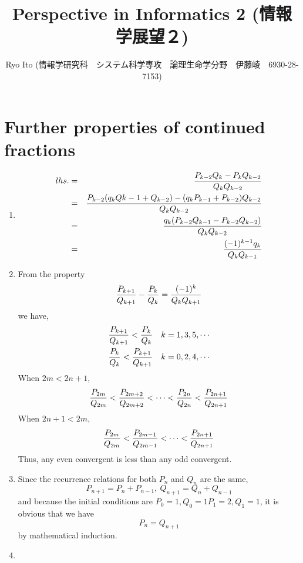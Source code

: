 \documentclass{jarticle}
\title{Perspective in Informatics 2 (情報学展望２)}
\author{Ryo Ito (情報学研究科　システム科学専攻　論理生命学分野　伊藤崚　6930-28-7153)}
\date{}
\begin{document}
\maketitle

\section{Further properties of continued fractions}
\begin{enumerate}
\item
\begin{eqnarray}
    lhs. &=& {P_{k-2}Q_k - P_kQ_{k-2}\over Q_kQ_{k-2}}\\
    &=& {P_{k-2}(q_kQ{k-1}+Q_{k-2}) - (q_kP_{k-1}+P_{k-2})Q_{k-2}\over Q_kQ_{k-2}}\\
    &=& {q_k(P_{k-2}Q_{k-1} - P_{k-2}Q_{k-2})\over Q_kQ_{k-2}}\\
    &=& {(-1)^{k-1}q_k\over Q_kQ_{k-1}}
\end{eqnarray}

\item
From the property
\begin{equation}
    {P_{k+1}\over Q_{k+1}} - {P_k\over Q_k} = {(-1)^k\over Q_kQ_{k+1}}
\end{equation}
we have,
\begin{eqnarray}
    {P_{k+1}\over Q_{k+1}} < {P_k \over Q_k} ~~~ k = 1,3,5,\cdots\\
    {P_k \over Q_k} < {P_{k+1} \over Q_{k+1}} ~~~ k = 0,2,4,\cdots
\end{eqnarray}
When $2m < 2n+1$,
\begin{equation}
    {P_{2m}\over Q_{2m}} < {P_{2m+2}\over Q_{2m+2}} < \cdots < {P_{2n}\over Q_{2n}} < {P_{2n+1}\over Q_{2n+1}}
\end{equation}
When $2n + 1 < 2m$,
\begin{equation}
    {P_{2m}\over Q_{2m}} < {P_{2m-1}\over Q_{2m-1}} < \cdots < {P_{2n+1}\over Q_{2n+1}}
\end{equation}
Thus, any even convergent is less than any odd convergent.

\item
Since the recurrence relations for both $P_n$ and $Q_n$ are the same,
\begin{equation}
    P_{n+1} = P_n + P_{n-1}, ~ Q_{n+1} = Q_n + Q_{n-1}
\end{equation}
and because the initial conditions are $P_0 = 1, Q_0 = 1 P_1 = 2, Q_1 = 1$, it is obvious that we have
\begin{equation}
    P_n = Q_{n+1}
\end{equation}
by mathematical induction.

\item


\end{enumerate}
    
\end{document}

